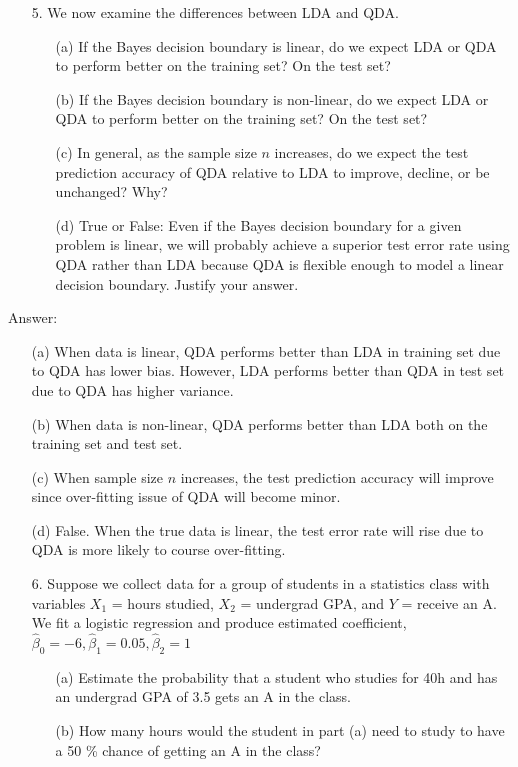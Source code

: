 \documentclass[12pt,a4paper]{article}%
\theoremstyle{definition}
\theoremstyle{plain}
\numberwithin{equation}{section}
\begin{document}
\begin{enumerate}
\item[5.] We now examine the differences between LDA and QDA.
\begin{enumerate}
\item[(a)] If the Bayes decision boundary is linear, do we expect LDA or QDA to perform better on the training set? On the test set?
\item[(b)] If the Bayes decision boundary is non-linear, do we expect LDA or QDA to perform better on the training set? On the test set?
\item[(c)] In general, as the sample size $n$ increases, do we expect the test prediction accuracy of QDA relative to LDA to improve, decline, or be unchanged? Why?
\item[(d)] True or False: Even if the Bayes decision boundary for a given problem is linear, we will probably achieve a superior test error rate using QDA rather than LDA because QDA is flexible enough to model a linear decision boundary. Justify your answer.
\end{enumerate}
\end{enumerate}

\begin{oframed}
Answer:
\begin{enumerate}
\item[(a)] When data is linear, QDA performs better than LDA in training set due to QDA has lower bias. However, LDA performs better than QDA in test set due to QDA has higher variance.
\item[(b)] When data is non-linear, QDA performs better than LDA both on the training set and test set.
\item[(c)] When sample size $n$ increases, the test prediction accuracy will improve since over-fitting issue of QDA will become minor. 
\item[(d)] False. When the true data is linear, the test error rate will rise due to QDA is more likely to course over-fitting.
\end{enumerate}
\end{oframed}
\begin{enumerate}
\item[6.] Suppose we collect data for a group of students in a statistics class with variables $X_{1}$ = hours studied, $X_{2}$ = undergrad GPA, and $Y$ = receive an A. 
We fit a logistic regression and produce estimated coefficient, $\hat{\beta}_{0}= -6, \hat{\beta}_{1}=0.05, \hat{\beta}_{2}= 1$
\begin{enumerate}
\item[(a)] Estimate the probability that a student who studies for 40h and has an undergrad GPA of 3.5 gets an A in the class.
\item[(b)] How many hours would the student in part (a) need to study to have a 50 \% chance of getting an A in the class?
\end{enumerate}
\end{enumerate}
\end{document}
